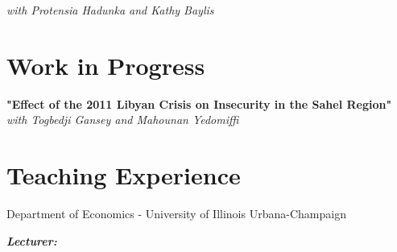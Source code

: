 \documentclass[letterpaper,11pt]{article}
\begin{document}
    \hspace{3mm}
    \textit{with Protensia Hadunka and Kathy Baylis}

\section{Work in Progress}

\begin{adjustwidth}{3mm}{0mm}
\textbf{"Effect of the 2011 Libyan Crisis on Insecurity in the Sahel Region"}  \textit{with Togbedji Gansey and Mahounan Yedomiffi}
\end{adjustwidth}

\section{Teaching Experience}
\begin{adjustwidth}{3mm}{0mm}
Department of Economics - University of Illinois Urbana-Champaign
\end{adjustwidth}

\begin{adjustwidth}{6mm}{0mm}
  \textbf{\textit{Lecturer:}}
\end{adjustwidth}
\end{document}
